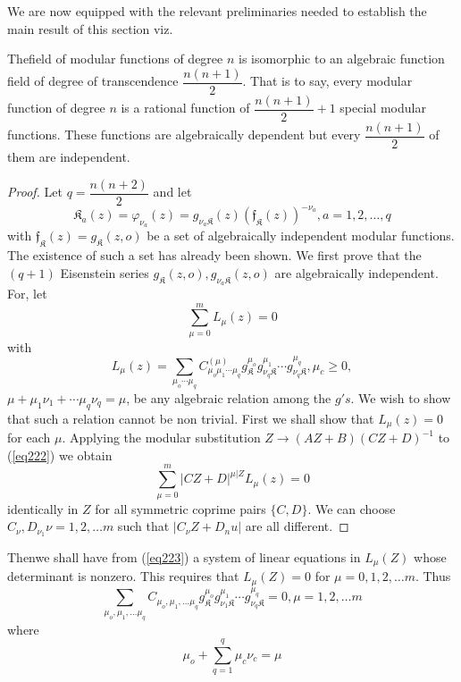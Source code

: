 We are now equipped with the relevant preliminaries needed to
establish the main result of this section viz. 

\setcounter{thm}{15}
\begin{thm}\label{chap12:thm16}%
The\pageoriginale field of modular functions of degree $n$ is
isomorphic to 
  an algebraic function field of degree of transcendence
  $\dfrac{n(n+1)}{2}$. That is to say, every modular function of
  degree $n$ is a rational function of $\dfrac{n(n+1)}{2}+1$
  special modular functions. These functions are algebraically
  dependent but every $\dfrac{n(n+1)}{2}$ of them are independent. 
\end{thm}

\begin{proof}
Let $q = \dfrac{n(n+2)}{2}$ and let
$$
\mathfrak{K}_a (z) = \varphi_{\nu_a}(z) = g_{\nu_a \mathfrak{K}}(z)
(\mathfrak{f}_\mathfrak{K}(z))^{-\nu_a}, a= 1,2, \ldots ,q 
$$
with $\mathfrak{f}_\mathfrak{K} (z) = g_\mathfrak{K} (z,o)$ be a set
of algebraically 
independent modular functions. The existence of such a set has already
been shown. We first prove that the $(q +1)$ Eisenstein series $g_\mathfrak{K}
(z,o), g_{\nu_a \mathfrak{K}} (z,o)$ are algebraically independent. For, let 
\begin{equation*}
\sum^{m}_{\mu =0} L_{\mu}(z) =0 \tag{222}\label{eq222}
\end{equation*}
with 
$$
L_\mu (z) = \sum _{\mu _o \cdots \mu_q} C_{\mu_o \mu_1 \cdots
  \mu_q}^{(\mu)} g_\mathfrak{K}^{\mu_o} g_{\nu_q \mathfrak{K}}^{\mu_1} \cdots g_{\nu_q
  \mathfrak{K}}^{\mu_q}, \mu_c \geq 0,  
$$
$\mu + \mu_1 \nu_1 + \cdots \mu_q \nu_q = \mu$, be any algebraic
relation among the $g' s$. We wish to show that such a relation cannot
be non trivial. First we  shall show that $L_{\mu}(z) = 0$ for each
$\mu$. Applying the modular substitution $Z \to (AZ + B) (CZ +
D)^{-1}$ to (\ref{eq222}) we obtain  
\begin{equation*}
\sum_{\mu =0}^{m} |CZ + D |^{\mu | Z} L_{\mu} (z) =0 \tag{223}\label{eq223} 
\end{equation*}
identically in $Z$ for all symmetric coprime pairs $\{C,D\}$. We can
choose $C_\nu, D_{\nu_1} \nu = 1,2, \ldots m$ such that $|C_{\nu} Z +
D_nu |$ are all different. 
\end{proof}

Then\pageoriginale we shall have from (\ref{eq223}) a system of linear
equations in $L_\mu (Z)$ whose determinant is nonzero. This requires
that $L_\mu (Z) = 0$ for $\mu = 0 , 1,2, \ldots m$. Thus   
$$
\sum_{\mu_o, \mu_1 , \ldots \mu_q } C_{\mu_o, \mu_1 , \ldots \mu_q }
g_{\mathfrak{K}}^{\mu_o} g_{\nu_1 \mathfrak{K}}^{\mu_1} \cdots
g^{\mu_q}_{\nu_q \mathfrak{K}} =0 , \mu = 1,2, \ldots m 
$$
where 
$$
\mu_o + \sum^{q}_{q=1}\mu_c \nu_c = \mu 
$$

